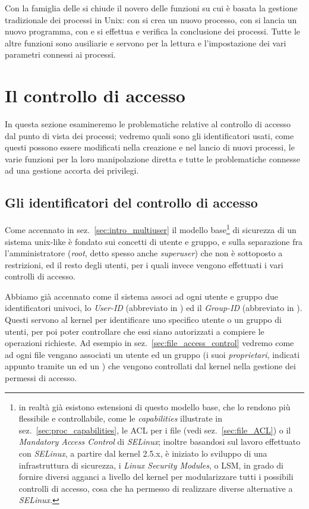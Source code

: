 Con la famiglia delle  si chiude il novero delle funzioni su cui è
basata la gestione tradizionale dei processi in Unix: con  si crea
un nuovo processo, con  si lancia un nuovo programma, con
 e  si effettua e verifica la conclusione dei
processi. Tutte le altre funzioni sono ausiliarie e servono per la lettura e
l'impostazione dei vari parametri connessi ai processi.



\section{Il controllo di accesso}
\label{sec:proc_perms}

In questa sezione esamineremo le problematiche relative al controllo di
accesso dal punto di vista dei processi; vedremo quali sono gli identificatori
usati, come questi possono essere modificati nella creazione e nel lancio di
nuovi processi, le varie funzioni per la loro manipolazione diretta e tutte le
problematiche connesse ad una gestione accorta dei privilegi.


\subsection{Gli identificatori del controllo di accesso}
\label{sec:proc_access_id}

Come accennato in sez.~\ref{sec:intro_multiuser} il modello base\footnote{in
  realtà già esistono estensioni di questo modello base, che lo rendono più
  flessibile e controllabile, come le \textit{capabilities} illustrate in
  sez.~\ref{sec:proc_capabilities}, le ACL per i file (vedi
  sez.~\ref{sec:file_ACL}) o il \textit{Mandatory Access Control} di
  \textit{SELinux}; inoltre basandosi sul lavoro effettuato con
  \textit{SELinux}, a partire dal kernel 2.5.x, è iniziato lo sviluppo di una
  infrastruttura di sicurezza, i \textit{Linux Security Modules}, o LSM, in
  grado di fornire diversi agganci a livello del kernel per modularizzare
  tutti i possibili controlli di accesso, cosa che ha permesso di realizzare
  diverse alternative a \textit{SELinux}.} 
di sicurezza di un sistema unix-like è fondato sui concetti di utente e
gruppo, e sulla separazione fra l'amministratore (\textsl{root}, detto spesso
anche \textit{superuser}) che non è sottoposto a restrizioni, ed il resto
degli utenti, per i quali invece vengono effettuati i vari controlli di
accesso.

Abbiamo già accennato come il sistema associ ad ogni utente e gruppo due
identificatori univoci, lo  \textsl{User-ID}
(abbreviato in ) ed il  \textsl{Group-ID}
(abbreviato in ). Questi servono al kernel per identificare uno
specifico utente o un gruppo di utenti, per poi poter controllare che essi
siano autorizzati a compiere le operazioni richieste.  Ad esempio in
sez.~\ref{sec:file_access_control} vedremo come ad ogni file vengano associati
un utente ed un gruppo (i suoi \textsl{proprietari}, indicati appunto tramite
un  ed un ) che vengono controllati dal kernel nella
gestione dei permessi di accesso.

